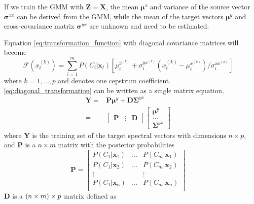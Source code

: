 If we train the GMM with $\mathbf{Z}=\mathbf{X}$, the mean $\boldsymbol{\mu}^x$ and variance of the source vector $\boldsymbol{\sigma}^{xx}$ can be derived from the GMM, while the mean of the target vectors $\boldsymbol{\mu}^y$ and cross-covariance matrix $\mathbf{\sigma}^{yx}$ are unknown and need to be estimated. 

Equation \eqref{eq:transformation_function} with diagonal covariance matrices will become
\begin{equation}
	\label{eq:diagonal_transformation}
	\mathcal{F}(x_t^{(k)}) = \sum_{i=1}^{m} P(C_i\vert \mathbf{x}_t) [\mu_i^{y^{(k)}}+\sigma_i^{yx^{(k)}}  (x_t^{(k)}-\mu_i^{x^{(k)}})/\sigma_i^{xx^{(k)}}]
\end{equation}
where $k=1,\dots,p$ and denotes one cepstrum coefficient. \eqref{eq:diagonal_transformation} can be written as a single matrix equation,
\begin{equation}
	\label{eq:least_square_problem}
	\begin{split}
		\mathbf{Y} = &\mathbf{P}\boldsymbol{\mu}^y + \mathbf{D}\mathbf{\Sigma}^{yx} \\
		= & \begin{bmatrix}
			\mathbf{P}& \vdots &\mathbf{D}
		\end{bmatrix}
		\begin{bmatrix}
			\boldsymbol{\mu^y} \\
			\dots \\
			\mathbf{\Sigma}^{yx}
		\end{bmatrix}
	\end{split}
\end{equation}
where $\mathbf{Y}$ is the training set of the target spectral vectors with dimensions $n\times p$, and $\mathbf{P}$ is a $n \times m$ matrix with the posterior probabilities
\begin{equation}
	\label{eq:P_matrix}
	\mathbf{P} = \begin{bmatrix}
		P(C_1\vert \mathbf{x}_1) & \dots & P(C_m\vert \mathbf{x}_1) \\
		P(C_1\vert \mathbf{x}_2) & \dots & P(C_m\vert \mathbf{x}_2) \\
		\vdots & & \vdots \\
		P(C_1\vert \mathbf{x}_n) & \dots & P(C_m\vert \mathbf{x}_n) \\
	\end{bmatrix}
\end{equation}
$\mathbf{D}$ is a $\left(n \times m\right)\times p$ matrix defined as
